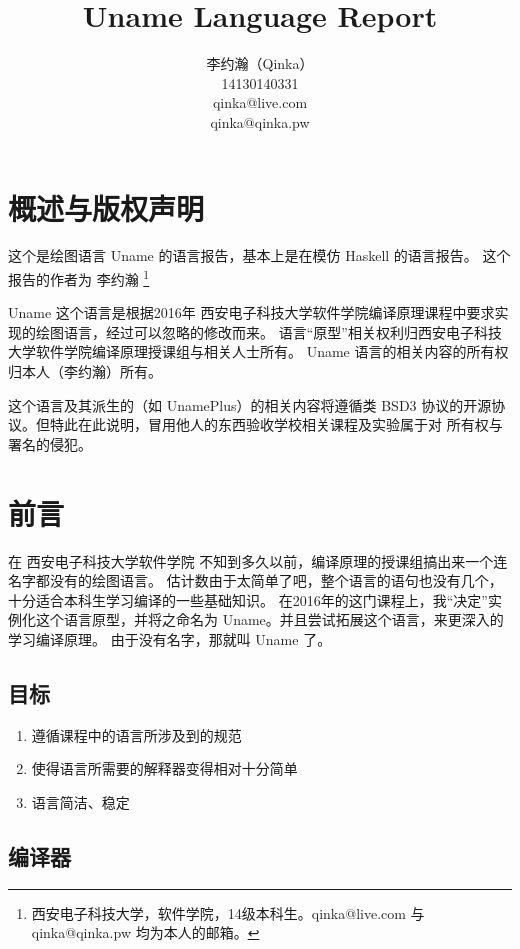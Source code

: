 \documentclass{ctexart}
\author{李约瀚（Qinka） \\ 14130140331 \\ qinka@live.com \\ qinka@qinka.pw}
\title{Uname Language Report}
\begin{document}
\maketitle

\section{概述与版权声明}
\label{sec:copyright}

这个是绘图语言 Uname 的语言报告，基本上是在模仿 Haskell 的语言报告。
这个报告的作者为 李约瀚 \footnote{西安电子科技大学，软件学院，14级本科生。qinka@live.com 与 qinka@qinka.pw 均为本人的邮箱。}

Uname 这个语言是根据2016年 西安电子科技大学软件学院编译原理课程中要求实现的绘图语言，经过可以忽略的修改而来。
语言“原型”相关权利归西安电子科技大学软件学院编译原理授课组与相关人士所有。 Uname 语言的相关内容的所有权归本人（李约瀚）所有。

这个语言及其派生的（如 UnamePlus）的相关内容将遵循类 BSD3 协议的开源协议。但特此在此说明，冒用他人的东西验收学校相关课程及实验属于对
所有权与署名的侵犯。

\section{前言}
\label{sec:preface}

在 西安电子科技大学软件学院 不知到多久以前，编译原理的授课组搞出来一个连名字都没有的绘图语言。
估计数由于太简单了吧，整个语言的语句也没有几个，十分适合本科生学习编译的一些基础知识。
在2016年的这门课程上，我“决定”实例化这个语言原型，并将之命名为 Uname。并且尝试拓展这个语言，来更深入的学习编译原理。
由于没有名字，那就叫 Uname 了。

\subsection{目标}
\label{sec:preface:goals}

\begin{enumerate}
\item 遵循课程中的语言所涉及到的规范
\item 使得语言所需要的解释器变得相对十分简单
\item 语言简洁、稳定
\end{enumerate}

\subsection{编译器}
\label{sec:preface:compiler}
\end{document}
